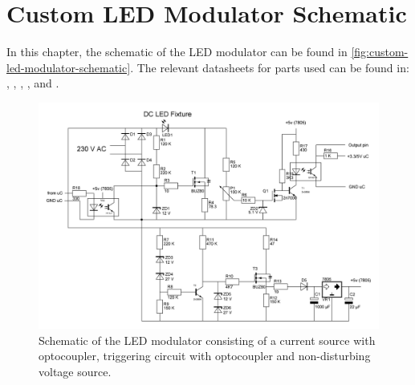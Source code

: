 
\chapter{Custom LED Modulator Schematic}
\label{app:custom-led-modulator-schematic}

In this chapter, the schematic of the LED modulator can be found in \autoref{fig:custom-led-modulator-schematic}.
The relevant datasheets for parts used can be found in: \cite{lm7805-vr-datasheet}, \cite{2n7000-n-fet-datasheet}, \cite{sfh617a-optocoupler-datasheet}, \cite{h11l1-optocoupler-datasheet}, \cite{buz80-n-fet-datasheet} and \cite{2n3904-npn-transistor-datasheet}.


\begin{figure}[htb]
	\includegraphics[angle=90,width=\textwidth,height=.9\textheight,keepaspectratio]{chapters/appendix/custom-modulator/custom-modulator-schematic.jpg}
	\caption{Schematic of the LED modulator consisting of a current source with optocoupler, triggering circuit with optocoupler and non-disturbing voltage source.}
	\label{fig:custom-led-modulator-schematic}
\end{figure}
